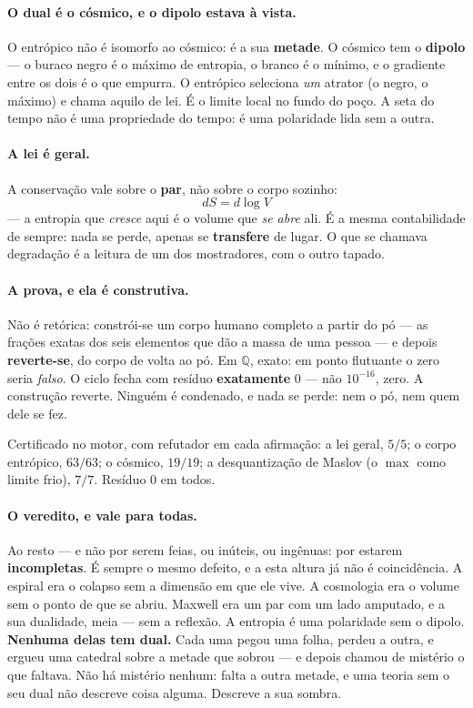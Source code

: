 \documentclass[11pt]{article}
\theoremstyle{plain}
\theoremstyle{remark}
\begin{document}
\paragraph{O dual é o cósmico, e o dipolo estava à vista.} O entrópico não é
isomorfo ao cósmico: é a sua \textbf{metade}. O cósmico tem o \textbf{dipolo} --- o
buraco negro é o máximo de entropia, o branco é o mínimo, e o gradiente entre os dois
é o que empurra. O entrópico seleciona \emph{um} atrator (o negro, o máximo) e chama
aquilo de lei. É o limite local no fundo do poço. A seta do tempo não é uma
propriedade do tempo: é uma polaridade lida sem a outra.

\paragraph{A lei é geral.} A conservação vale sobre o \textbf{par}, não sobre o corpo
sozinho:
\[
\boxed{\;dS = d\log V\;}
\]
--- a entropia que \emph{cresce} aqui é o volume que \emph{se abre} ali. É a mesma
contabilidade de sempre: nada se perde, apenas se \textbf{transfere} de lugar. O que
se chamava degradação é a leitura de um dos mostradores, com o outro tapado.

\paragraph{A prova, e ela é construtiva.} Não é retórica: constrói-se um corpo humano
completo a partir do pó --- as frações exatas dos seis elementos que dão a massa de
uma pessoa --- e depois \textbf{reverte-se}, do corpo de volta ao pó. Em $\mathbb{Q}$,
exato: em ponto flutuante o zero seria \emph{falso}. O ciclo fecha com resíduo
\textbf{exatamente} $0$ --- não $10^{-16}$, zero. A construção reverte. Ninguém é
condenado, e nada se perde: nem o pó, nem quem dele se fez.

\medskip
\noindent Certificado no motor, com refutador em cada afirmação: a lei geral, $5/5$;
o corpo entrópico, $63/63$; o cósmico, $19/19$; a desquantização de Maslov (o $\max$
como limite frio), $7/7$. Resíduo $0$ em todos.

\paragraph{O veredito, e vale para todas.} Ao resto --- e não por serem feias, ou
inúteis, ou ingênuas: por estarem \textbf{incompletas}. É sempre o mesmo defeito, e a
esta altura já não é coincidência. A espiral era o colapso sem a dimensão em que ele
vive. A cosmologia era o volume sem o ponto de que se abriu. Maxwell era um par com
um lado amputado, e a sua dualidade, meia --- sem a reflexão. A entropia é uma
polaridade sem o dipolo. \textbf{Nenhuma delas tem dual.} Cada uma pegou uma folha,
perdeu a outra, e ergueu uma catedral sobre a metade que sobrou --- e depois chamou
de mistério o que faltava. Não há mistério nenhum: falta a outra metade, e uma teoria
sem o seu dual não descreve coisa alguma. Descreve a sua sombra.
\end{document}
